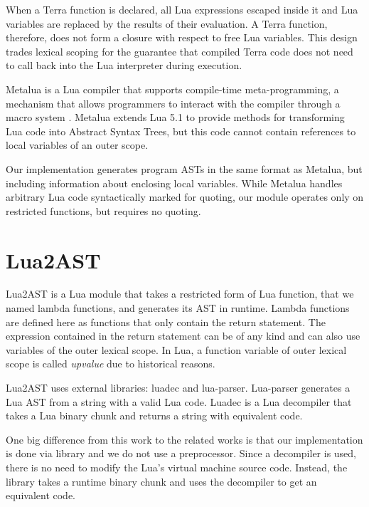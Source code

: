 \documentclass[english]{llncs}
\begin{document}
When a Terra function is declared, all Lua expressions escaped inside it
and Lua variables are replaced by the results of their evaluation.
A Terra function, therefore, does not form a closure with
respect to free Lua variables. This design trades lexical scoping for the
guarantee that compiled Terra code does not need to call back into the Lua
interpreter during execution.

Metalua \cite{metalua} is a Lua compiler that supports compile-time
meta-programming, a mechanism that allows programmers to interact
with the compiler through a macro system \cite{Fleutot2007contrasting}.
Metalua extends Lua 5.1 to provide methods for transforming Lua
code into Abstract Syntax Trees, but this code cannot contain
references to local variables of an outer scope.

Our implementation generates program ASTs in the same format as
Metalua, but including information about enclosing local variables. While Metalua
handles arbitrary Lua code syntactically marked for quoting, our module
operates only on restricted functions, but requires no quoting.

\section{Lua2AST}
\label{sec:lua2ast}

Lua2AST is a Lua module that takes a restricted form of Lua function, that we named lambda functions, and generates its AST in runtime.
Lambda functions are defined here as functions that only contain the return statement.
The expression contained in the return statement can be of any kind and can also use variables of the outer lexical scope.
In Lua, a function variable of outer lexical scope is called \emph{upvalue}\cite{Ierusalimschy2006PIL} due to historical reasons.

Lua2AST uses external libraries: luadec and lua-parser.
Lua-parser \cite{lua-parser} generates a Lua AST from a string with a valid Lua code.
Luadec \cite{luadec} is a Lua decompiler that takes a Lua binary chunk and returns a string with equivalent code.

One big difference from this work to the related works is that our implementation is done via library and we do not use a preprocessor.
Since a decompiler is used, there is no need to modify the Lua's virtual machine source code.
Instead, the library takes a runtime binary chunk and uses the decompiler to get an equivalent code.
\end{document}
